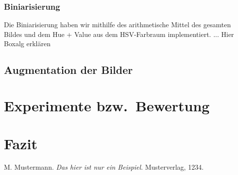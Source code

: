 \documentclass[a4,german]{article}
\begin{document}
\subsubsection{Biniarisierung}
Die Biniarisierung haben wir mithilfe des arithmetische Mittel des gesamten Bildes und dem Hue + Value aus dem HSV-Farbraum implementiert.
...
Hier Boxalg erklären
\subsection{Augmentation der Bilder}




\section{Experimente bzw.\ Bewertung}



\section{Fazit}




\begin{thebibliography}{99}
	
 M. Mustermann. \textit{Das hier ist nur ein Beispiel}. Musterverlag, 1234.

\end{thebibliography}
\end{document}
